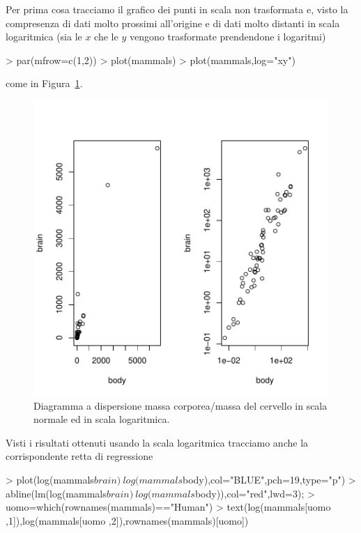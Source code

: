 \documentclass[onecolumn,12pt]{book}
\begin{document}
Per prima cosa tracciamo il grafico dei punti  in scala non trasformata e, visto la compresenza di dati molto prossimi all'origine e di dati molto distanti in scala logaritmica (sia le $x$ che le $y$ vengono trasformate prendendone i logaritmi)
\begin{Schunk}
\begin{Sinput}
> par(mfrow=c(1,2))
> plot(mammals)
> plot(mammals,log="xy")
\end{Sinput}
\end{Schunk}
come in Figura~\ref{fig:duemammals}.\begin{figure}[htbp]
\begin{center}
\includegraphics{RbookParte2-060}
\caption{Diagramma a dispersione massa corporea/massa del cervello in scala normale ed in scala logaritmica. }
\label{fig:duemammals}
\end{center}
\end{figure}
Visti i  risultati ottenuti usando la scala logaritmica tracciamo anche la corrispondente retta di regressione
\begin{Schunk}
\begin{Sinput}
> plot(log(mammals$brain)~log(mammals$body),col="BLUE",pch=19,type="p")
> abline(lm(log(mammals$brain)~ log(mammals$body)),col="red",lwd=3);
> uomo=which(rownames(mammals)=="Human")
> text(log(mammals[uomo ,1]),log(mammals[uomo ,2]),rownames(mammals)[uomo])
\end{Sinput}
\end{Schunk}
\end{document}

